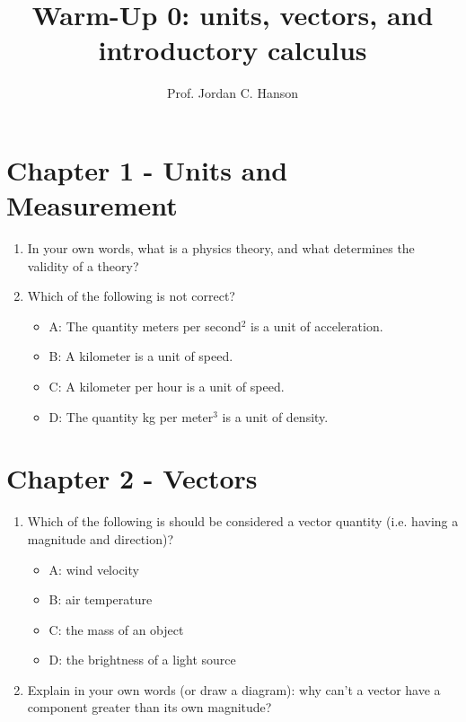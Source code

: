 \documentclass{article}
\begin{document}
\title{Warm-Up 0: units, vectors, and introductory calculus}
\author{Prof. Jordan C. Hanson}

\maketitle

\section{Chapter 1 - Units and Measurement}

\begin{enumerate}
\item In your own words, what is a physics theory, and what determines the validity of a theory? \\ \vspace{0.5cm}
\item Which of the following is not correct?
\begin{itemize}
\item A: The quantity meters per second$^2$ is a unit of acceleration.
\item B: A kilometer is a unit of speed.
\item C: A kilometer per hour is a unit of speed.
\item D: The quantity kg per meter$^3$ is a unit of density.
\end{itemize}
\end{enumerate}

\section{Chapter 2 - Vectors}

\begin{enumerate}
\item Which of the following is should be considered a vector quantity (i.e. having a magnitude and direction)?
\begin{itemize}
\item A: wind velocity
\item B: air temperature
\item C: the mass of an object
\item D: the brightness of a light source
\end{itemize}
\item Explain in your own words (or draw a diagram): why can't a vector have a component greater than its own magnitude?
\end{enumerate}
\end{document}
